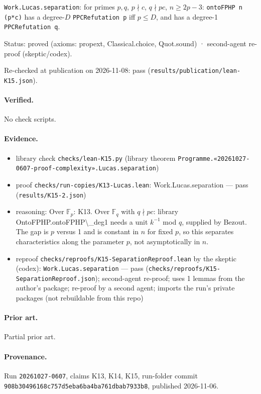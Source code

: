 \documentclass{article}
\begin{document}
\texttt{Work.Lucas.separation}: for primes $p,q$, $p\nmid c$, $q\nmid pc$, $n\ge2p-3$: \texttt{ontoFPHP n (p*c)} has a degree-$D$ \texttt{PPCRefutation p} iff $p\le D$, and has a degree-1 \texttt{PPCRefutation q}.

Status: proved (axioms: propext, Classical.choice, Quot.sound) · second-agent re-proof (skeptic/codex).

Re-checked at publication on 2026-11-08: pass (\texttt{results/publication/lean-K15.json}).

\paragraph{Verified.}
No check scripts.

\paragraph{Evidence.}
\begin{itemize}
\item library check \texttt{checks/lean-K15.py} (library theorem \texttt{Programme.«20261027-0607-proof-complexity».Lucas.separation})
\item proof \texttt{checks/run-copies/K13-Lucas.lean}: Work.Lucas.separation --- pass (\texttt{results/K15-2.json})
\item reasoning: Over $\mathbb F_p$: K13. Over $\mathbb F_q$ with $q\nmid pc$: library OntoFPHP.ontoFPHP\textbackslash{}\_deg1 needs a unit $k^{-1}$ mod $q$, supplied by Bezout. The gap is $p$ versus 1 and is constant in $n$ for fixed $p$, so this separates characteristics along the parameter $p$, not asymptotically in $n$.
\item reproof \texttt{checks/reproofs/K15-SeparationReproof.lean} by the skeptic (codex): \texttt{Work.Lucas.separation} --- pass (\texttt{checks/reproofs/K15-SeparationReproof.json}); second-agent re-proof; uses 1 lemmas from the author's package; re-proof by a second agent; imports the run's private packages (not rebuildable from this repo)
\end{itemize}

\paragraph{Prior art.} Partial prior art.


\paragraph{Provenance.}
Run \texttt{20261027-0607}, claims K13, K14, K15, run-folder commit \texttt{908b30496168c757d5eba6ba4ba761dbab7933b8}, published 2026-11-06.
\end{document}
